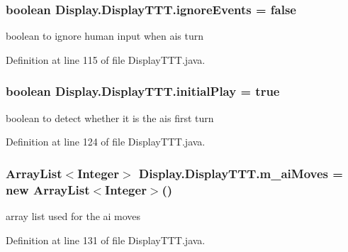 \subsubsection[{ignore\+Events}]{\setlength{\rightskip}{0pt plus 5cm}boolean Display.\+Display\+T\+T\+T.\+ignore\+Events = false\hspace{0.3cm}{\ttfamily [private]}}\label{class_display_1_1_display_t_t_t_a713fdaab41d88af675c9f54dfcdb87a2}
boolean to ignore human input when ai\textquotesingle{}s turn 

Definition at line 115 of file Display\+T\+T\+T.\+java.

\hypertarget{class_display_1_1_display_t_t_t_a7a6b9526f0a795edccb3911009d74842}{}
\subsubsection[{initial\+Play}]{\setlength{\rightskip}{0pt plus 5cm}boolean Display.\+Display\+T\+T\+T.\+initial\+Play = true\hspace{0.3cm}{\ttfamily [private]}}\label{class_display_1_1_display_t_t_t_a7a6b9526f0a795edccb3911009d74842}
boolean to detect whether it is the ai\textquotesingle{}s first turn 

Definition at line 124 of file Display\+T\+T\+T.\+java.

\hypertarget{class_display_1_1_display_t_t_t_aaa3a8705876d9e60253f6c4599966ae9}{}
\subsubsection[{m\+\_\+ai\+Moves}]{\setlength{\rightskip}{0pt plus 5cm}Array\+List$<$Integer$>$ Display.\+Display\+T\+T\+T.\+m\+\_\+ai\+Moves = new Array\+List$<$Integer$>$()\hspace{0.3cm}{\ttfamily [private]}}\label{class_display_1_1_display_t_t_t_aaa3a8705876d9e60253f6c4599966ae9}
array list used for the ai moves 

Definition at line 131 of file Display\+T\+T\+T.\+java.

\hypertarget{class_display_1_1_display_t_t_t_a3f540c3d30082e201fcb37c9623d6d27}{}
